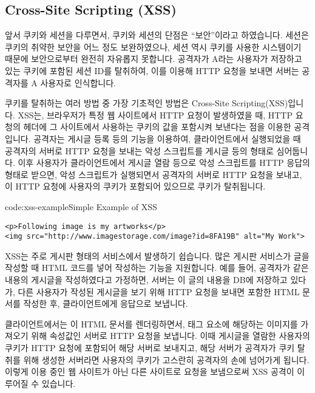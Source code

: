 
\subsection*{Cross-Site Scripting (XSS)}

앞서 쿠키와 세션을 다루면서, 쿠키와 세션의 단점은 ``보안''이라고 하였습니다. 세션은 쿠키의 취약한 보안을 어느 정도 보완하였으나, 세션 역시 쿠키를 사용한 시스템이기 때문에 보안으로부터 완전히 자유롭지 못합니다. 공격자가 A라는 사용자가 저장하고 있는 쿠키에 포함된 세션 ID를 탈취하여, 이를 이용해 HTTP 요청을 보내면 서버는 공격자를 A 사용자로 인식합니다.

쿠키를 탈취하는 여러 방법 중 가장 기초적인 방법은 Cross-Site Scripting(XSS)입니다. XSS는, 브라우저가 특정 웹 사이트에서 HTTP 요청이 발생하였을 때, HTTP 요청의 헤더에 그 사이트에서 사용하는 쿠키의 값을 포함시켜 보낸다는 점을 이용한 공격입니다. 공격자는 게시글 등록 등의 기능을 이용하여, 클라이언트에서 실행되었을 때 공격자의 서버로 HTTP 요청을 보내는 악성 스크립트를 게시글 등의 형태로 심어둡니다. 이후 사용자가 클라이언트에서 게시글 열람 등으로 악성 스크립트를 HTTP 응답의 형태로 받으면, 악성 스크립트가 실행되면서 공격자의 서버로 HTTP 요청을 보내고, 이 HTTP 요청에 사용자의 쿠키가 포함되어 있으므로 쿠키가 탈취됩니다.

\begin{codeenv}{code:xss-example}{Simple Example of XSS}\begin{verbatim}
<p>Following image is my artworks</p>
<img src="http://www.imagestorage.com/image?id=8FA19B" alt="My Work">
\end{verbatim}
\end{codeenv}

XSS는 주로 게시판 형태의 서비스에서 발생하기 쉽습니다. 많은 게시판 서비스가 글을 작성할 때 HTML 코드를 넣어 작성하는 기능을 지원합니다. 예를 들어, 공격자가 \과 같은 내용의 게시글을 작성하였다고 가정하면, 서버는 이 글의 내용을 DB에 저장하고 있다가, 다른 사용자가 작성된 게시글을 보기 위해 HTTP 요청을 보내면 \을 포함한 HTML 문서를 작성한 후, 클라이언트에게 응답으로 보냅니다.

클라이언트에서는 이 HTML 문서를 렌더링하면서,  태그 요소에 해당하는 이미지를 가져오기 위해  속성값인 서버로 HTTP 요청을 보냅니다. 이때 게시글을 열람한 사용자의 쿠키가 HTTP 요청에 포함되어 해당 서버로 보내지고, 해당 서버가 공격자가 쿠키 탈취를 위해 생성한 서버라면 사용자의 쿠키가 고스란히 공격자의 손에 넘어가게 됩니다. 이렇게 이용 중인 웹 사이트가 아닌 다른 사이트로 요청을 보냄으로써 XSS 공격이 이루어질 수 있습니다.

